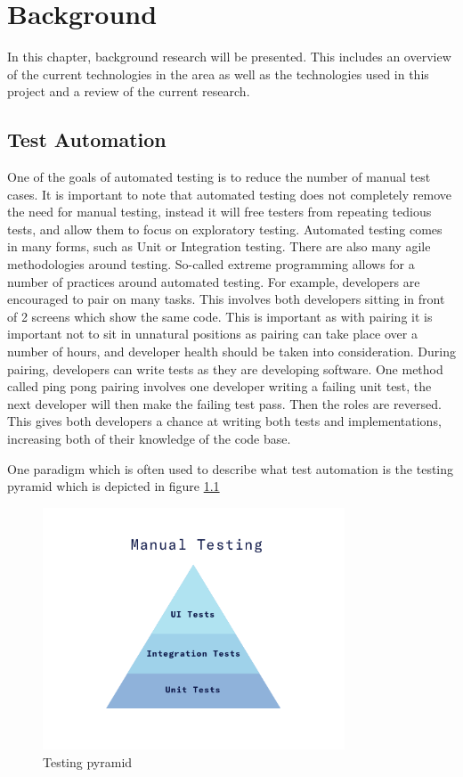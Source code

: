 \chapter{Background}

In this chapter, background research will be presented. This includes an overview of the current technologies in the area as well as the technologies used in this project and a review of the current research.

\section{Test Automation}

One of the goals of automated testing is to reduce the number of manual test cases. It is important to note that automated testing does not completely remove the need for manual testing, instead it will free testers from repeating tedious tests, and allow them to focus on exploratory testing. Automated testing comes in many forms, such as Unit or Integration testing. There are also many agile methodologies around testing. So-called extreme programming allows for a number of practices around automated testing. For example, developers are encouraged to pair on many tasks. This involves both developers sitting in front of 2 screens which show the same code. This is important as with pairing it is important not to sit in unnatural positions as pairing can take place over a number of hours, and developer health should be taken into consideration. During pairing, developers can write tests as they are developing software. One method called ping pong pairing involves one developer writing a failing unit test, the next developer will then make the failing test pass. Then the roles are reversed. This gives both developers a chance at writing both tests and implementations, increasing both of their knowledge of the code base. 

One paradigm which is often used to describe what test automation is the testing pyramid which is depicted in figure \ref{fig:testing-pyramid}

\begin{figure}[!h]
  \centering
    \includegraphics[width=0.8\textwidth]{figures/testing-pyramid.png}
    \caption{Testing pyramid}
    \label{fig:testing-pyramid}
\end{figure}

